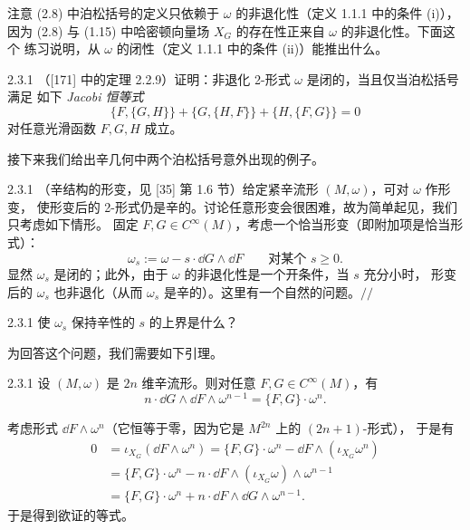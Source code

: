注意 (2.8) 中泊松括号的定义只依赖于 $\omega$ 的非退化性（定义 1.1.1 中的条件 (i)），
因为 (2.8) 与 (1.15) 中哈密顿向量场 $X_G$ 的存在性正来自 $\omega$ 的非退化性。下面这个
练习说明，从 $\omega$ 的闭性（定义 1.1.1 中的条件 (ii)）能推出什么。

\begin{wexer}{2.3.1}
（[171] 中的定理 2.2.9）证明：非退化 2-形式 $\omega$ 是闭的，当且仅当泊松括号满足
如下 \emph{Jacobi 恒等式}
\[
  \{F,\{G,H\}\}+\{G,\{H,F\}\}+\{H,\{F,G\}\}=0
\]
对任意光滑函数 $F,G,H$ 成立。
\end{wexer}

接下来我们给出辛几何中两个泊松括号意外出现的例子。

\begin{wexam}{2.3.1}
（辛结构的形变，见 [35] 第 1.6 节）给定紧辛流形 $(M,\omega)$，可对 $\omega$ 作形变，
使形变后的 2-形式仍是辛的。讨论任意形变会很困难，故为简单起见，我们只考虑如下情形。
固定 $F,G\in C^\infty(M)$，考虑一个恰当形变（即附加项是恰当形式）：
\[
  \omega_s:=\omega-s\cdot\dd G\wedge\dd F\qquad\text{对某个 } s\ge0 .
\]
显然 $\omega_s$ 是闭的；此外，由于 $\omega$ 的非退化性是一个开条件，当 $s$ 充分小时，
形变后的 $\omega_s$ 也非退化（从而 $\omega_s$ 是辛的）。这里有一个自然的问题。\hfill$//$
\end{wexam}

\begin{wque}{2.3.1}
使 $\omega_s$ 保持辛性的 $s$ 的上界是什么？
\end{wque}

为回答这个问题，我们需要如下引理。

\begin{wlem}{2.3.1}
设 $(M,\omega)$ 是 $2n$ 维辛流形。则对任意 $F,G\in C^\infty(M)$，有
\[
  n\cdot\dd G\wedge\dd F\wedge\omega^{n-1}=\{F,G\}\cdot\omega^n .
\]
\end{wlem}

\begin{wproof}
考虑形式 $\dd F\wedge\omega^n$（它恒等于零，因为它是 $M^{2n}$ 上的 $(2n+1)$-形式），
于是有
\begin{align*}
  0&=\iota_{X_G}(\dd F\wedge\omega^n)
  =\{F,G\}\cdot\omega^n-\dd F\wedge(\iota_{X_G}\omega^n)\\
  &=\{F,G\}\cdot\omega^n-n\cdot\dd F\wedge(\iota_{X_G}\omega)\wedge\omega^{n-1}\\
  &=\{F,G\}\cdot\omega^n+n\cdot\dd F\wedge\dd G\wedge\omega^{n-1}.
\end{align*}
于是得到欲证的等式。
\end{wproof}

